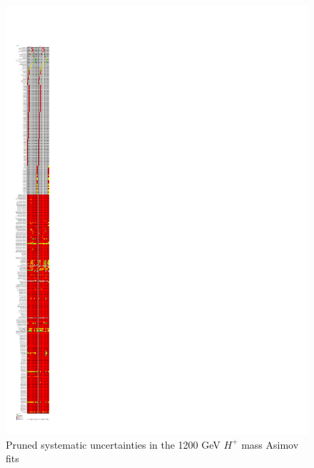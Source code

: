 \begin{figure}[H]
  \centering
  \includegraphics[keepaspectratio, scale=0.85]{images/Pruning/Pruning_Asimov_Hp1200_Contained80_DL1r_70.pdf}
  \caption{Pruned systematic uncertainties in the 1200 GeV $H^{+}$ mass Asimov fits}
  \label{fig:Pruning_Asimov_Hp1200_Contained80_DL1r_70}
\end{figure}

